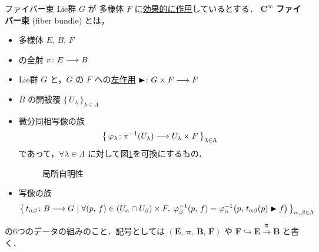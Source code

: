 \documentclass[geometry_main]{subfiles}
\begin{document}
\begin{mydef}[label=def.fiber-1,breakable]{\cinfty ファイバー束}
    Lie群 $G$ が \cinfty 多様体 $F$ に\hyperref[def:Lie-action]{効果的に作用}しているとする．
    $\bm{C^\infty}$ \textbf{ファイバー束} (fiber bundle) とは，
    \begin{itemize}
        \item \cinfty 多様体 $E,\, B,\, F$
        \item \cinfty の全射 $\pi \colon E \longrightarrow B$
        \item Lie群 $G$ と，$G$ の $F$ への\hyperref[def:Lie-action]{左作用} $\blacktriangleright \colon G \times F \longrightarrow F$
        \item $B$ の開被覆 $\bigl\{\, U_\lambda  \,\bigr\}_{\lambda \in \Lambda}$
        \item 
        微分同相写像の族
        \begin{align}
            \bigl\{\, \varphi_\lambda \colon \pi^{-1}(U_\lambda) \longrightarrow U_\lambda \times F  \,\bigr\}_{\lambda \in \Lambda}
        \end{align}
        であって，$\forall \lambda \in \Lambda$ に対して図\ref{fig.fiber1}を可換にするもの．
        \begin{figure}[H]
            \centering
            \caption{局所自明性}
            \label{fig.fiber1}
        \end{figure}%
        \item \cinfty 写像の族
        \begin{align}
            \bigl\{\, t_{\alpha\beta} \colon B \longrightarrow G \bigm| \forall (p,\, f) \in (U_\alpha \cap U_\beta) \times F,\; \varphi_\beta^{-1} (p,\, f) = \varphi_\alpha^{-1} \bigl(p,\, t_{\alpha\beta} (p) \blacktriangleright f\bigr)  \,\bigr\}_{\alpha,\, \beta \in \Lambda}
        \end{align}
    \end{itemize}
    の6つのデータの組みのこと．記号としては $\bm{(E,\, \pi,\, B,\, F)}$ や $\bm{F \hookrightarrow E \xrightarrow{\pi} B}$ と書く．
		

\end{mydef}
\end{document}
